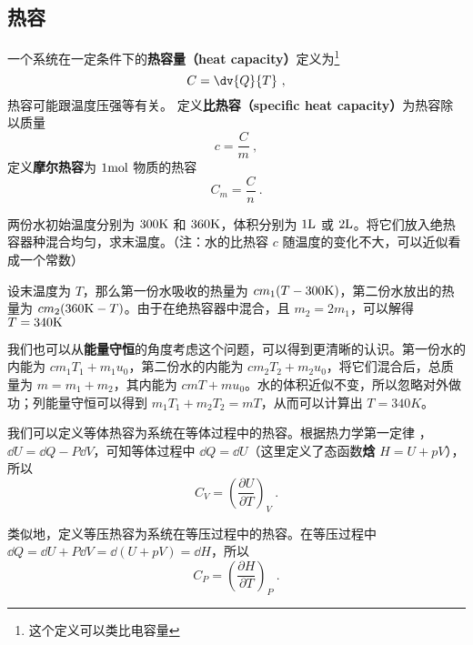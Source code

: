 
\begin{issues}
\issueTODO
\end{issues}
\subsection{热容}
一个系统在一定条件下的\textbf{热容量（heat capacity）}定义为\footnote{这个定义可以类比电容量}
\begin{equation}
C = \dv{Q}{T}~,
\end{equation}
热容可能跟温度压强等有关。 定义\textbf{比热容（specific heat capacity）}为热容除以质量
\begin{equation}
c = \frac{C}{m}~,
\end{equation}
定义\textbf{摩尔热容}为 $1 \rm{mol}$ 物质的热容
\begin{equation}
C_m=\frac{C}{n}~.
\end{equation}

\begin{example}{}
两份水初始温度分别为 $300\rm{K}$ 和 $360\rm{K}$，体积分别为 $1\rm{L}$ 或 $2 \rm{L}$。将它们放入绝热容器种混合均匀，求末温度。（注：水的比热容 $c$ 随温度的变化不大，可以近似看成一个常数）

设末温度为 $T$，那么第一份水吸收的热量为 $c m_1(T-300\rm{K})$，第二份水放出的热量为 $cm_2(360{\rm{K}}-T)$。由于在绝热容器中混合，且 $m_2=2m_1$，可以解得 $T=340\rm{K}$

我们也可以从\textbf{能量守恒}的角度考虑这个问题，可以得到更清晰的认识。第一份水的内能为 $cm_1T_1+m_1u_0$，第二份水的内能为 $cm_2T_2+m_2u_0$，将它们混合后，总质量为 $m=m_1+m_2$，其内能为 $cmT+mu_0$。水的体积近似不变，所以忽略对外做功；列能量守恒可以得到 $m_1T_1+m_2T_2=mT$，从而可以计算出 $T=340K$。
\end{example}

我们可以定义等体热容为系统在等体过程中的热容。根据热力学第一定律 ，$\dd U=\dd Q-P\dd V$，可知等体过程中 $\dd Q=\dd U$（这里定义了态函数\textbf{焓} $H=U+pV$），所以
\begin{equation}\label{eq_ThCapa_1}
C_V=\left(\frac{\partial U}{\partial T}\right)_V~.
\end{equation}

类似地，定义等压热容为系统在等压过程中的热容。在等压过程中 $\dd Q=\dd U+P\dd V=\dd (U+pV)=\dd H$，所以
\begin{equation}\label{eq_ThCapa_2}
C_P=\left(\frac{\partial H}{\partial T}\right)_P~.
\end{equation}

